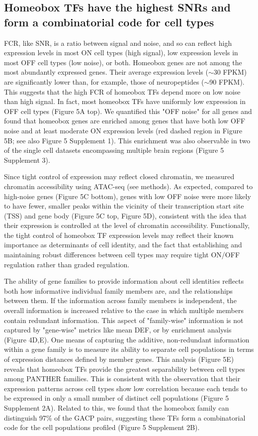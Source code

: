 \subsection{Homeobox TFs have the highest SNRs and form a combinatorial code for cell types}
FCR, like SNR, is a ratio between signal and noise, and so can reflect high expression levels in most ON cell types (high signal), low expression levels in most OFF cell types (low noise), or both. Homeobox genes are not among the most abundantly expressed genes. Their average expression levels ($\sim$30 FPKM) are significantly lower than, for example, those of neuropeptides ($\sim$90 FPKM). This suggests that the high FCR of homeobox TFs depend more on low noise than high signal. In fact, most homeobox TFs have uniformly low expression in OFF cell types (Figure 5A top). We quantified this "OFF noise" for all genes and found that homeobox genes are enriched among genes that have both low OFF noise and at least moderate ON expression levels (red dashed region in Figure 5B; see also Figure 5 Supplement 1). This enrichment was also observable in two of the single cell datasets encompassing multiple brain regions (Figure 5 Supplement 3). 

Since tight control of expression may reflect closed chromatin, we measured chromatin accessibility using ATAC-seq (see methods). As expected, compared to high-noise genes (Figure 5C bottom), genes with low OFF noise were more likely to have fewer, smaller peaks within the vicinity of their transcription start site (TSS) and gene body (Figure 5C top, Figure 5D), consistent with the idea that their expression is controlled at the level of chromatin accessibility. Functionally, the tight control of homeobox TF expression levels may reflect their known importance as determinants of cell identity, and the fact that establishing and maintaining robust differences between cell types may require tight ON/OFF regulation rather than graded regulation.

The ability of gene families to provide information about cell identities reflects both how informative individual family members are, and the relationships between them. If the information across family members is independent, the overall information is increased relative to the case in which multiple members contain redundant information. This aspect of "family-wise" information is not captured by "gene-wise" metrics like mean DEF, or by enrichment analysis (Figure 4D,E). One means of capturing the additive, non-redundant information within a gene family is to measure its ability to separate cell populations in terms of expression distances defined by member genes. This analysis (Figure 5E) reveals that homeobox TFs provide the greatest separability between cell types among PANTHER families. This is consistent with the observation that their expression patterns across cell types show low correlation because each tends to be expressed in only a small number of distinct cell populations (Figure 5 Supplement 2A). Related to this, we found that the homeobox family can distinguish 97\% of the GACP pairs, suggesting these TFs form a combinatorial code for the cell populations profiled (Figure 5 Supplement 2B). 

